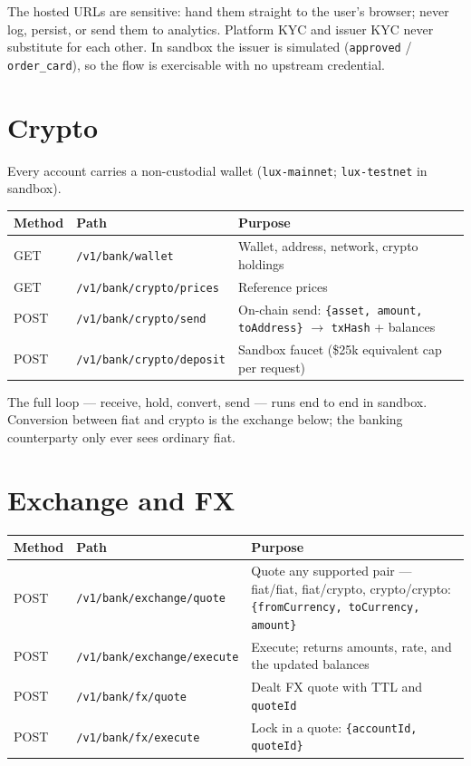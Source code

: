 \documentclass[11pt]{article}
\newcommand{\ep}[1]{\texttt{\small #1}}
\begin{document}
The hosted URLs are sensitive: hand them straight to the user's
browser; never log, persist, or send them to analytics. Platform KYC
and issuer KYC never substitute for each other. In sandbox the
issuer is simulated (\ep{approved} / \ep{order\_card}), so the flow
is exercisable with no upstream credential.

\section{Crypto}

Every account carries a non-custodial wallet
(\ep{lux-mainnet}; \ep{lux-testnet} in sandbox).

\begin{table}[H]
\centering
\small
\begin{tabular}{@{}llp{6.8cm}@{}}
\toprule
\textbf{Method} & \textbf{Path} & \textbf{Purpose} \\
\midrule
GET & \ep{/v1/bank/wallet} & Wallet, address, network, crypto holdings \\
GET & \ep{/v1/bank/crypto/prices} & Reference prices \\
POST & \ep{/v1/bank/crypto/send} & On-chain send: \ep{\{asset, amount, toAddress\}} $\rightarrow$ \ep{txHash} + balances \\
POST & \ep{/v1/bank/crypto/deposit} & Sandbox faucet (\$25k equivalent cap per request) \\
\bottomrule
\end{tabular}
\end{table}

The full loop --- receive, hold, convert, send --- runs end to end in
sandbox. Conversion between fiat and crypto is the exchange below;
the banking counterparty only ever sees ordinary fiat.

\section{Exchange and FX}

\begin{table}[H]
\centering
\small
\begin{tabular}{@{}llp{6.8cm}@{}}
\toprule
\textbf{Method} & \textbf{Path} & \textbf{Purpose} \\
\midrule
POST & \ep{/v1/bank/exchange/quote} & Quote any supported pair --- fiat/fiat, fiat/crypto, crypto/crypto: \ep{\{fromCurrency, toCurrency, amount\}} \\
POST & \ep{/v1/bank/exchange/execute} & Execute; returns amounts, rate, and the updated balances \\
POST & \ep{/v1/bank/fx/quote} & Dealt FX quote with TTL and \ep{quoteId} \\
POST & \ep{/v1/bank/fx/execute} & Lock in a quote: \ep{\{accountId, quoteId\}} \\
\bottomrule
\end{tabular}
\end{table}
\end{document}
